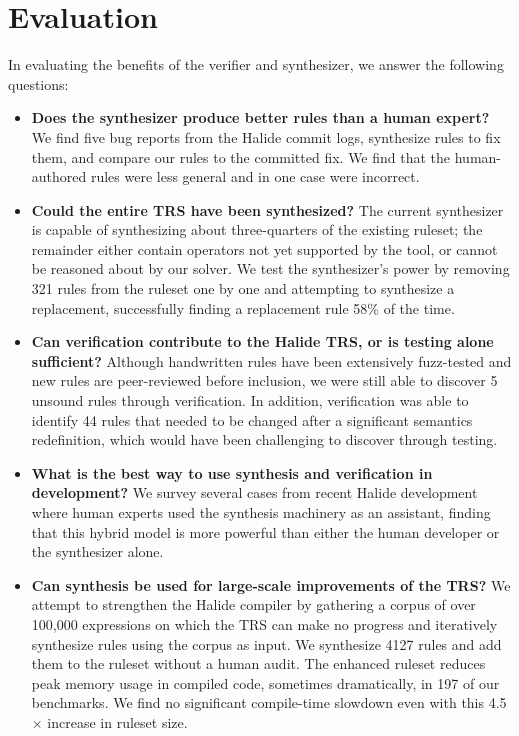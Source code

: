 \documentclass[acmsmall,review,anonymous]{acmart}\settopmatter{printfolios=true,printccs=false,printacmref=false}
\begin{document}
\section{Evaluation}

\newcommand{\PercentPossibleToSynth}{69\%}
\newcommand{\NumRulesInCorrectnessExperiment}{321}
\newcommand{\PercentRulesResynthesized}{58\%}

In evaluating the benefits of the verifier and synthesizer, we answer the following questions:

\begin{itemize}
  \item \textbf{Does the synthesizer produce better rules than a human expert?} We find five bug reports from the Halide commit logs, synthesize rules to fix them, and compare our rules to the committed fix. We find that the human-authored rules were less general and in one case were incorrect.
  \item \textbf{Could the entire TRS have been synthesized?} The current synthesizer is capable of synthesizing about three-quarters of the existing ruleset; the remainder either contain operators not yet supported by the tool, or cannot be reasoned about by our solver. We test the synthesizer's power by removing \NumRulesInCorrectnessExperiment{} rules from the ruleset one by one and attempting to synthesize a replacement, successfully finding a replacement rule \PercentRulesResynthesized{} of the time.
  \item \textbf{Can verification contribute to the Halide TRS, or is testing alone sufficient?} Although handwritten rules have been extensively fuzz-tested and new rules are peer-reviewed before inclusion, we were still able to discover 5 unsound rules through verification. In addition, verification was able to identify 44 rules that needed to be changed after a significant semantics redefinition, which would have been challenging to discover through testing.
  \item \textbf{What is the best way to use synthesis and verification in development?} We survey several cases from recent Halide development where human experts used the synthesis machinery as an assistant, finding that this hybrid model is more powerful than either the human developer or the synthesizer alone.
  \item \textbf{Can synthesis be used for large-scale improvements of the TRS?} We attempt to strengthen the Halide compiler by gathering a corpus of over 100,000 expressions on which the TRS can make no progress and iteratively synthesize rules using the corpus as input. We synthesize 4127 rules and add them to the ruleset without a human audit. The enhanced ruleset reduces peak memory usage in compiled code, sometimes dramatically, in 197 of our benchmarks. We find no significant compile-time slowdown even with this 4.5$\times$ increase in ruleset size.
\end{itemize}
\end{document}
